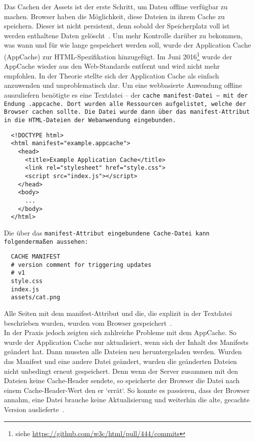 Das Cachen der \gls{Assets} ist der erste Schritt, um Daten offline verfügbar zu machen. Browser haben die Möglichkeit, diese Dateien in ihrem Cache zu speichern.
Dieser ist nicht persistent, denn sobald der Speicherplatz voll ist werden enthaltene Daten gelöscht~\cite{cache}.
%
%
Um mehr Kontrolle darüber zu bekommen, was wann und für wie lange gespeichert werden soll, wurde der Application Cache (AppCache) zur \gls{HTML}-Spezifikation hinzugefügt.
Im Juni 2016\footnote{siehe \url{https://github.com/w3c/html/pull/444/commits}} wurde der AppCache wieder aus den Web-Standards entfernt und wird nicht mehr empfohlen.
In der Theorie stellte sich der Application Cache als einfach anzuwenden und unproblematisch dar. Um eine webbasierte Anwendung offline auszuliefern benötigte es eine Textdatei -- der \tt{cache manifest}-Datei -- mit der Endung \tt{.appcache}. Dort wurden alle Ressourcen aufgelistet, welche der Browser cachen sollte.
Die Datei wurde dann über das \tt{manifest}-Attribut in die \gls{HTML}-Dateien der Webanwendung eingebunden.
%
\begin{lstlisting}
  <!DOCTYPE html>
  <html manifest="example.appcache">
    <head>
      <title>Example Application Cache</title>
      <link rel="stylesheet" href="style.css">
      <script src="index.js"></script>
    </head>
    <body>
      ...
    </body>
  </html>
\end{lstlisting}
%
Die über das \tt{manifest}-Attribut eingebundene Cache-Datei kann folgendermaßen aussehen:
\begin{lstlisting}
  CACHE MANIFEST
  # version comment for triggering updates
  # v1
  style.css
  index.js
  assets/cat.png
\end{lstlisting}
Alle Seiten mit dem manifest-Attribut und die, die explizit in der Textdatei beschrieben wurden, wurden vom Browser gespeichert~\cite{appcache}.\\
In der Praxis jedoch zeigten sich zahlreiche Probleme mit dem AppCache. So wurde der Application Cache nur aktualisiert, wenn sich der Inhalt des Manifests geändert hat. Dann mussten alle Dateien neu heruntergeladen werden.
Wurden das Manifest und eine andere Datei geändert, wurden die geänderten Dateien nicht unbedingt erneut gespeichert. Denn wenn der Server zusammen mit den Dateien keine Cache-Header sendete, so speicherte der Browser die Datei nach einem Cache-Header-Wert den er `errät`. So konnte es passieren, dass der Browser annahm, eine Datei brauche keine Aktualisierung und weiterhin die alte, gecachte Version auslieferte~\cite{noappcache}.\\
